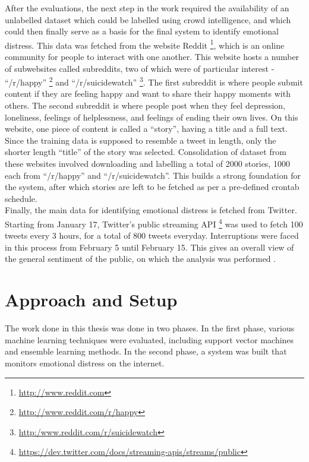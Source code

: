 After the evaluations, the next step in the work required the availability of an unlabelled dataset which could be labelled using crowd intelligence, and which could then finally serve as a basis for the final system to identify emotional distress. This data was fetched from the website Reddit \footnote{\url{http://www.reddit.com}}, which is an online community for people to interact with one another. This website hosts a number of subwebsites called subreddits, two of which were of particular interest - ``/r/happy'' \footnote{\url{http://www.reddit.com/r/happy}} and ``/r/suicidewatch'' \footnote{\url{http:/www.reddit.com/r/suicidewatch}}. The first subreddit is where people submit content if they are feeling happy and want to share their happy moments with others. The second subreddit is where people post when they feel depression, loneliness, feelings of helplessness, and feelings of ending their own lives. On this website, one piece of content is called a ``story'', having a title and a full text. Since the training data is supposed to resemble a tweet in length, only the shorter length ``title'' of the story was selected. Consolidation of dataset from these websites involved downloading and labelling a total of 2000 stories, 1000 each from ``/r/happy'' and ``/r/suicidewatch''. This builds a strong foundation for the system, after which stories are left to be fetched as per a pre-defined crontab schedule.\\

Finally, the main data for identifying emotional distress is fetched from Twitter. Starting from January 17, Twitter's public streaming API \footnote{\url{https://dev.twitter.com/docs/streaming-apis/streams/public}} was used to fetch 100 tweets every 3 hours, for a total of 800 tweets everyday. Interruptions were faced in this process from February 5 until February 15. This gives an overall view of the general sentiment of the public, on which the analysis was performed .

\section{Approach and Setup}
The work done in this thesis was done in two phases. In the first phase, various machine learning techniques were evaluated, including support vector machines and ensemble learning methods. In the second phase, a system was built that monitors emotional distress on the internet.\\

